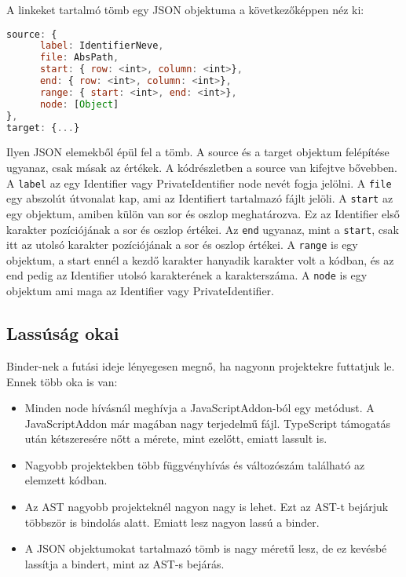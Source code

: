 A linkeket tartalmó tömb egy JSON objektuma a következőképpen néz ki:

\begin{lstlisting}[caption={Binder JSON objektuma}, label={lst:binder_json_arg}, language={JavaScript}]
source: {
      label: IdentifierNeve,
      file: AbsPath,
      start: { row: <int>, column: <int>},
      end: { row: <int>, column: <int>},
      range: { start: <int>, end: <int>},
      node: [Object]
},
target: {...}
\end{lstlisting}

Ilyen JSON elemekből épül fel a tömb.
A source és a target objektum felépítése ugyanaz, csak másak az értékek.
A kódrészletben a source van kifejtve bővebben.
A \texttt{label} az egy Identifier vagy PrivateIdentifier node nevét fogja jelölni.
A \texttt{file} egy abszolút útvonalat kap, ami az Identifiert tartalmazó fájlt jelöli.
A \texttt{start} az egy objektum, amiben külön van sor és oszlop meghatározva. Ez az Identifier első karakter pozíciójának a sor és oszlop értékei.
Az \texttt{end} ugyanaz, mint a \texttt{start}, csak itt az utolsó karakter pozíciójának a sor és oszlop értékei.
A \texttt{range} is egy objektum, a start ennél a kezdő karakter hanyadik karakter volt a kódban, és az end pedig az Identifier utolsó karakterének a karakterszáma.
A \texttt{node} is egy objektum ami maga az Identifier vagy PrivateIdentifier.

\subsection{Lassúság okai}

Binder-nek a futási ideje lényegesen megnő, ha nagyonn projektekre futtatjuk le.
Ennek több oka is van:

\begin{itemize}
      \item Minden node hívásnál meghívja a JavaScriptAddon-ból egy metódust.
      A JavaScriptAddon már magában nagy terjedelmű fájl. TypeScript támogatás után kétszeresére nőtt a mérete, mint ezelőtt, emiatt lassult is.
      \item Nagyobb projektekben több függvényhívás és változószám található az elemzett kódban.
      \item Az AST nagyobb projekteknél nagyon nagy is lehet.
      Ezt az AST-t bejárjuk többször is bindolás alatt. Emiatt lesz nagyon lassú a binder.
      \item A JSON objektumokat tartalmazó tömb is nagy méretű lesz, de ez kevésbé lassítja a bindert, mint az AST-s bejárás.
\end{itemize}

